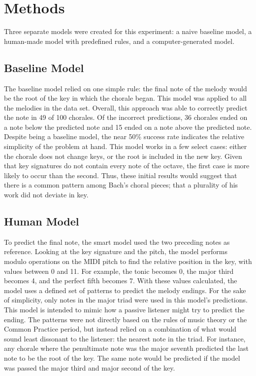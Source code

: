 \documentclass[12pt]{article}
\begin{document}
\section{Methods}
Three separate models were created for this experiment: a naive baseline model, a human-made model with predefined rules, and a computer-generated model.

\subsection{Baseline Model}
The baseline model relied on one simple rule: the final note of the melody would be the root of the key in which the chorale began. This model was applied to all the melodies in the data set. Overall, this approach was able to correctly predict the note in 49 of 100 chorales. Of the incorrect predictions, 36 chorales ended on a note below the predicted note and 15 ended on a note above the predicted note.\\

Despite being a baseline model, the near 50\% success rate indicates the relative simplicity of the problem at hand. This model works in a few select cases: either the chorale does not change keys, or the root is included in the new key. Given that key signatures do not contain every note of the octave, the first case is more likely to occur than the second. Thus, these initial results would suggest that there is a common pattern among Bach's choral pieces; that a plurality of his work did not deviate in key.

\subsection{Human Model}
To predict the final note, the smart model used the two preceding notes as reference. Looking at the key signature and the pitch, the model performs modulo operations on the MIDI pitch to find the relative position in the key, with values between 0 and 11. For example, the tonic becomes 0, the major third becomes 4, and the perfect fifth becomes 7. With these values calculated, the model uses a defined set of patterns to predict the melody endings. For the sake of simplicity, only notes in the major triad were used in this model's predictions.\\

This model is intended to mimic how a passive listener might try to predict the ending. The patterns were not directly based on the rules of music theory or the Common Practice period, but instead relied on a combination of what would sound least dissonant to the listener: the nearest note in the triad. For instance, any chorale where the penultimate note was the major seventh predicted the last note to be the root of the key. The same note would be predicted if the model was passed the major third and major second of the key.\\
\end{document}
